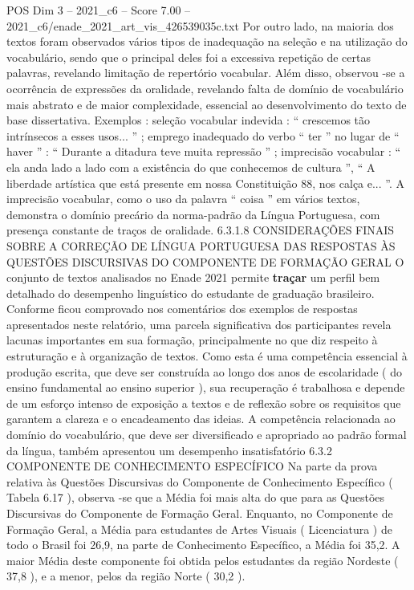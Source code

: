 \begin{textsample}{POS Dim 3 – 2021\_c6 – Score 7.00 – 2021\_c6/enade\_2021\_art\_vis\_426539035c.txt}
Por outro lado, na maioria dos textos foram observados vários tipos de inadequação na seleção e na utilização do vocabulário, sendo que o principal deles foi a excessiva repetição de certas palavras, revelando limitação de repertório vocabular.
Além disso, observou -se a ocorrência de expressões da oralidade, revelando falta de domínio de vocabulário mais abstrato e de maior complexidade, essencial ao desenvolvimento do texto de base dissertativa.
Exemplos : seleção vocabular indevida : “ crescemos tão intrínsecos a esses usos... ” ; emprego inadequado do verbo “ ter ” no lugar de “ haver ” : “ Durante a ditadura teve muita repressão ” ; imprecisão vocabular : “ ela anda lado a lado com a existência do que conhecemos de cultura ”, “ A liberdade artística que está presente em nossa Constituição 88, nos calça e... ”.
A imprecisão vocabular, como o uso da palavra “ coisa ” em vários textos, demonstra o domínio precário da norma-padrão da Língua Portuguesa, com presença constante de traços de oralidade. 6.3.1.8 CONSIDERAÇÕES FINAIS SOBRE A CORREÇÃO DE LÍNGUA PORTUGUESA DAS RESPOSTAS ÀS QUESTÕES DISCURSIVAS DO COMPONENTE DE FORMAÇÃO GERAL O conjunto de textos analisados no Enade 2021 permite \textbf{traçar} um perfil bem detalhado do desempenho linguístico do estudante de graduação brasileiro.
Conforme ficou comprovado nos comentários dos exemplos de respostas apresentados neste relatório, uma parcela significativa dos participantes revela lacunas importantes em sua formação, principalmente no que diz respeito à estruturação e à organização de textos.
Como esta é uma competência essencial à produção escrita, que deve ser construída ao longo dos anos de escolaridade ( do ensino fundamental ao ensino superior ), sua recuperação é trabalhosa e depende de um esforço intenso de exposição a textos e de reflexão sobre os requisitos que garantem a clareza e o encadeamento das ideias.
A competência relacionada ao domínio do vocabulário, que deve ser diversificado e apropriado ao padrão formal da língua, também apresentou um desempenho insatisfatório 6.3.2 COMPONENTE DE CONHECIMENTO ESPECÍFICO Na parte da prova relativa às Questões Discursivas do Componente de Conhecimento Específico ( Tabela 6.17 ), observa -se que a Média foi mais alta do que para as Questões Discursivas do Componente de Formação Geral.
Enquanto, no Componente de Formação Geral, a Média para estudantes de Artes Visuais ( Licenciatura ) de todo o Brasil foi 26,9, na parte de Conhecimento Específico, a Média foi 35,2.
A maior Média deste componente foi obtida pelos estudantes da região Nordeste ( 37,8 ), e a menor, pelos da região Norte ( 30,2 ).

\end{textsample}
